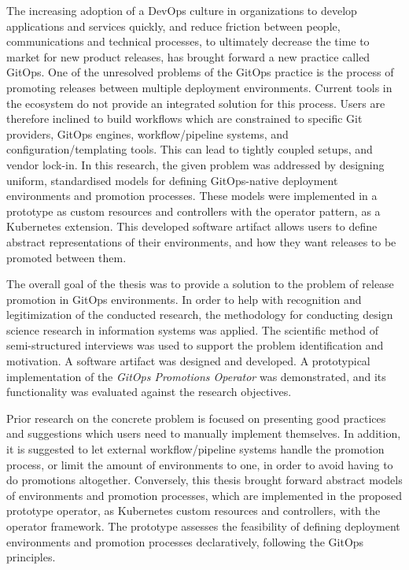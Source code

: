 The increasing adoption of a DevOps culture in organizations to develop applications and services quickly,
and reduce friction between people, communications and technical processes,
to ultimately decrease the time to market for new product releases,
has brought forward a new practice called GitOps.
%
One of the unresolved problems of the GitOps practice is
the process of promoting releases between multiple deployment environments.
Current tools in the ecosystem do not provide an integrated solution for this process.
Users are therefore inclined to build workflows which are constrained to specific
Git providers, GitOps engines,
workflow/pipeline systems, and configuration/templating tools. This can lead to tightly coupled setups,
and vendor lock-in.
%
In this research,
the given problem was addressed by designing uniform, standardised models for
defining GitOps-native deployment environments and promotion processes.
These models were implemented in a prototype as custom resources and controllers with the
operator pattern, as a Kubernetes extension.
This developed software artifact allows users to define abstract representations
of their environments, and how they want releases to be promoted between them.

The overall goal of the thesis was to provide a solution to the problem of
release promotion in GitOps environments.
%
In order to help with recognition and legitimization of the conducted research,
the methodology for conducting design science research in information systems
was applied. The scientific method of semi-structured interviews was used
to support the problem identification and motivation.
A software artifact was designed and developed.
A prototypical implementation of the \textit{GitOps Promotions Operator}
was demonstrated, and its functionality was evaluated against the
research objectives.

Prior research on the concrete problem is focused on presenting
good practices and suggestions
which users need to manually implement themselves.
In addition, it is suggested to let external workflow/pipeline systems handle the promotion process,
or limit the amount of environments to one, in order to avoid having to do promotions altogether.
Conversely, this thesis brought forward
abstract models of environments and promotion processes,
which are implemented in the proposed prototype operator,
as Kubernetes custom resources and controllers, with the operator framework.
The prototype assesses the feasibility of
defining deployment environments and promotion processes declaratively,
following the GitOps principles.

